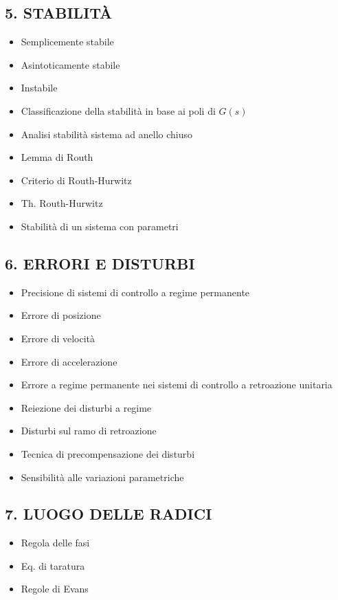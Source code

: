 \documentclass[11pt,a4paper]{article}
\newcommand{\pagina}[1]{\clearpage}
\begin{document}
\subsection*{5. STABILITÀ}
\begin{itemize}
\item Semplicemente stabile
\item Asintoticamente stabile
\item Instabile
\item Classificazione della stabilità in base ai poli di $G(s)$
\item Analisi stabilità sistema ad anello chiuso
\item Lemma di Routh
\item Criterio di Routh-Hurwitz
\item Th. Routh-Hurwitz
\item Stabilità di un sistema con parametri
\end{itemize}
\pagina{2}
\subsection*{6. ERRORI E DISTURBI}
\begin{itemize}
\item Precisione di sistemi di controllo a regime permanente
\item Errore di posizione
\item Errore di velocità
\item Errore di accelerazione
\item Errore a regime permanente nei sistemi di controllo a retroazione unitaria
\item Reiezione dei disturbi a regime
\item Disturbi sul ramo di retroazione
\item Tecnica di precompensazione dei disturbi
\item Sensibilità alle variazioni parametriche
\end{itemize}
\subsection*{7. LUOGO DELLE RADICI}
\begin{itemize}
\item Regola delle fasi
\item Eq. di taratura
\item Regole di Evans
\end{itemize}

\pagina{23}
\end{document}
